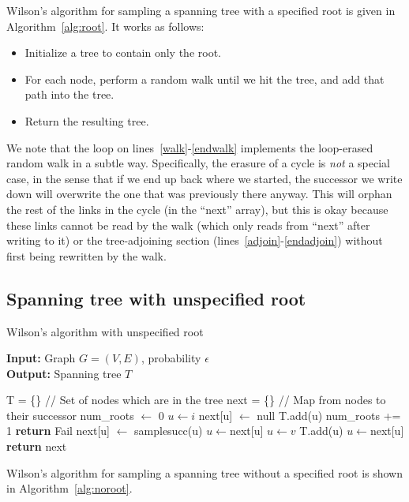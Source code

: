 \documentclass[11pt]{article}
\begin{document}
Wilson's algorithm for sampling a spanning tree with a specified root is given
in Algorithm~\ref{alg:root}. It works as follows:
\begin{itemize}
\item Initialize a tree to contain only the root.
\item For each node, perform a random walk until we hit the tree, and add that
path into the tree.
\item Return the resulting tree.
\end{itemize}


We note that the loop on lines~\ref{walk}-\ref{endwalk} implements the
loop-erased random walk in a subtle way.  Specifically, the erasure of a cycle is
\emph{not} a special case, in the sense that if we end up back where we started,
the successor we write down will overwrite the one that was previously there
anyway. This will orphan the rest of the links in the cycle (in the ``next''
array), but this is okay because these links cannot be read by the walk (which only
reads from ``next'' after writing to it) or the tree-adjoining section
(lines~\ref{adjoin}-\ref{endadjoin}) without first being rewritten by the
walk.

\subsection{Spanning tree with unspecified root}
\begin{algorithm}
\caption{Wilson's algorithm with unspecified root}
\label{alg:noroot}
\textbf{Input: }Graph $G=(V,E)$, probability $\epsilon$ \\
\textbf{Output: }Spanning tree $T$
\begin{algorithmic}
\STATE T = \{\}                   // Set of nodes which are in the tree
\STATE next = \{\}                // Map from nodes to their successor
\STATE num\_roots $\leftarrow$ 0
\STATE $u \leftarrow i$
\STATE next[u] $\leftarrow$ null
\STATE T.add(u)
\STATE num\_roots += 1
\STATE \textbf{return} Fail
\ENDIF
\ELSE
\STATE next[u] $\leftarrow$ samplesucc(u)
\STATE $u \leftarrow $next[u]
\ENDIF
\STATE $u \leftarrow v$
\ENDWHILE
{} \label{adjoin2}
\STATE T.add(u)
\STATE $u \leftarrow $next[u]
\ENDWHILE
\ENDFOR
\STATE \textbf{return} next
\end{algorithmic}
\end{algorithm}

Wilson's algorithm for sampling a spanning tree without a specified root is
shown in Algorithm~\ref{alg:noroot}.
\end{document}
